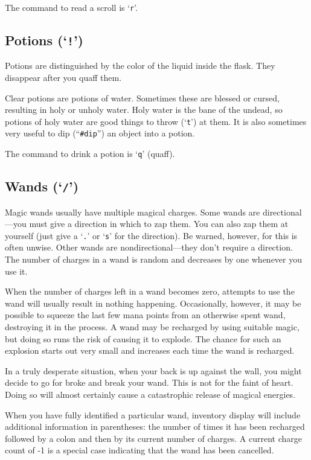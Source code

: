 The command to read a scroll is `{\tt r}'.
\subsection*{Potions (`{\tt !}')}


Potions are distinguished by the color of the liquid inside the flask.
They disappear after you quaff them.

Clear potions are potions of water.  Sometimes these are blessed or cursed,
resulting in holy or unholy water.  Holy water is the bane of the undead, so
potions of holy water are good things to throw (`{\tt t}') at them.  It is also
sometimes very useful to dip (``{\tt \#dip}'') an object into a potion.

The command to drink a potion is `{\tt q}' (quaff).
\subsection*{Wands (`{\tt /}')}


Magic wands usually have multiple magical charges.  Some wands are
directional---you must give a direction in which to zap them.  You can also
zap them at yourself (just give a `{\tt .}' or `{\tt s}' for the direction). Be warned,
however, for this is often unwise.  Other wands are nondirectional---they
don't require a direction.  The number of charges in a wand is random and
decreases by one whenever you use it.

When the number of charges left in a wand becomes zero, attempts to use the
wand will usually result in nothing happening.  Occasionally, however, it may
be possible to squeeze the last few mana points from an otherwise spent wand,
destroying it in the process.  A wand may be recharged by using suitable
magic, but doing so runs the risk of causing it to explode.  The chance
for such an explosion starts out very small and increases each time the
wand is recharged.

In a truly desperate situation, when your back is up against the wall, you
might decide to go for broke and break your wand.  This is not for the faint
of heart.  Doing so will almost certainly cause a catastrophic release of
magical energies.

When you have fully identified a particular wand, inventory display will
include additional information in parentheses: the number of times it has
been recharged followed by a colon and then by its current number of charges.
A current charge count of -1 is a special case indicating that the wand
has been cancelled.

